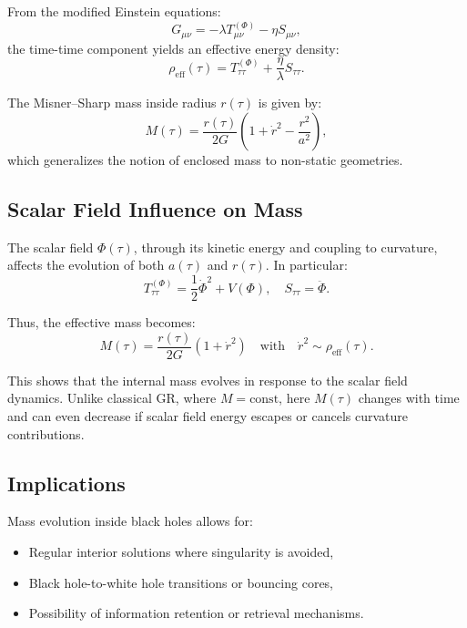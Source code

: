 \documentclass[12pt]{article}
\begin{document}
From the modified Einstein equations:
\[
G_{\mu\nu} = -\lambda T_{\mu\nu}^{(\Phi)} - \eta S_{\mu\nu},
\]
the time-time component yields an effective energy density:
\begin{equation}
\rho_{\text{eff}}(\tau) = T^{(\Phi)}_{\tau\tau} + \frac{\eta}{\lambda} S_{\tau\tau}.
\end{equation}

The Misner–Sharp mass inside radius \( r(\tau) \) is given by:
\begin{equation}
M(\tau) = \frac{r(\tau)}{2G} \left( 1 + \dot{r}^2 - \frac{r^2}{a^2} \right),
\end{equation}
which generalizes the notion of enclosed mass to non-static geometries.

\subsection{Scalar Field Influence on Mass}

The scalar field \( \Phi(\tau) \), through its kinetic energy and coupling to curvature, affects the evolution of both \( a(\tau) \) and \( r(\tau) \). In particular:
\[
T^{(\Phi)}_{\tau\tau} = \frac{1}{2} \dot{\Phi}^2 + V(\Phi), \quad
S_{\tau\tau} = \ddot{\Phi}.
\]

Thus, the effective mass becomes:
\begin{equation}
M(\tau) = \frac{r(\tau)}{2G} \left( 1 + \dot{r}^2 \right) \quad \text{with} \quad \dot{r}^2 \sim \rho_{\text{eff}}(\tau).
\end{equation}

This shows that the internal mass evolves in response to the scalar field dynamics. Unlike classical GR, where \( M = \text{const} \), here \( M(\tau) \) changes with time and can even decrease if scalar field energy escapes or cancels curvature contributions.

\subsection{Implications}

Mass evolution inside black holes allows for:
\begin{itemize}
    \item Regular interior solutions where singularity is avoided,
    \item Black hole-to-white hole transitions or bouncing cores,
    \item Possibility of information retention or retrieval mechanisms.
\end{itemize}
\end{document}
